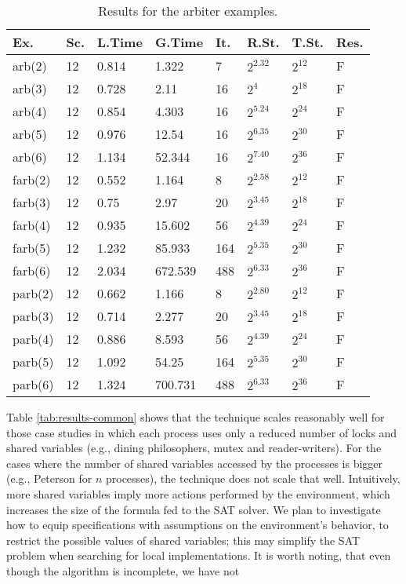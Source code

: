 \begin{wraptable}[19]{r}{.60\textwidth}
\vspace{-0.5cm}
\begin{tabular}{|l|l|l|l|l|l|l|l|}
    \hline
        Ex. & Sc. & L.Time & G.Time & It. & R.St. & T.St. & Res. \\ \hline
        \textsf{arb(2)} & 12 & 0.814 &  1.322 & 7 & $2^{2.32}$  & $2^{12}$ & F \\ \hline
        \textsf{arb(3)} & 12 & 0.728 & 2.11 & 16 & $2^4$ & $2^{18}$ & F \\ \hline
        \textsf{arb(4)} & 12 & 0.854 & 4.303 & 16 & $2^{5.24}$ & $2^{24}$ & F \\ \hline
        \textsf{arb(5)} & 12 & 0.976 & 12.54 & 16 & $2^{6.35}$ & $2^{30}$ & F \\ \hline
        \textsf{arb(6)} & 12 & 1.134 & 52.344 & 16 & $2^{7.40}$ & $2^{36}$ & F \\ \hline
        \textsf{farb(2)} & 12 & 0.552 & 1.164 & 8 & $2^{2.58}$ & $2^{12}$ & F \\ \hline
        \textsf{farb(3)} & 12 & 0.75 & 2.97 & 20 & $2^{3.45}$ & $2^{18}$ & F \\ \hline
        \textsf{farb(4)} & 12 & 0.935 & 15.602 & 56 & $2^{4.39}$ & $2^{24}$ & F \\ \hline
        \textsf{farb(5)} & 12 & 1.232 & 85.933 & 164 & $2^{5.35}$ & $2^{30}$ & F \\ \hline
        \textsf{farb(6)} & 12 & 2.034 & 672.539 & 488 & $2^{6.33}$ & $2^{36}$ & F\\ \hline
        \textsf{parb(2)} & 12 & 0.662 & 1.166 & 8 & $2^{2.80}$ & $2^{12}$ & F\\ \hline
        \textsf{parb(3)} & 12 & 0.714 & 2.277 & 20 & $2^{3.45}$ & $2^{18}$ & F \\ \hline
        \textsf{parb(4)} & 12 & 0.886 & 8.593 & 56 & $2^{4.39}$ & $2^{24}$ & F\\ \hline
        \textsf{parb(5)} & 12 & 1.092 & 54.25 & 164 & $2^{5.35}$ & $2^{30}$ & F \\ \hline
        \textsf{parb(6)} & 12 &1.324 & 700.731 & 488 & $2^{6.33}$ & $2^{36}$ & F \\ \hline
\end{tabular}
\caption{Results for the arbiter examples.}\label{tab:results-arbiter}
\end{wraptable}
%
Table \ref{tab:results-common} shows that the technique scales reasonably well for those case studies in which each process uses only a reduced number of locks and shared variables (e.g., dining philosophers, mutex and reader-writers). For the cases where the number of shared variables accessed by the processes is bigger (e.g., Peterson for $n$ processes), the technique does not scale that well. Intuitively, more shared variables imply more actions performed by the environment, which increases the size of the formula fed to the SAT solver.  We plan to investigate how to equip specifications with assumptions on the environment's behavior, to restrict the possible values of shared variables; this may simplify the SAT problem when searching for local implementations.  It is worth noting, that even though the algorithm is incomplete, we have not 
